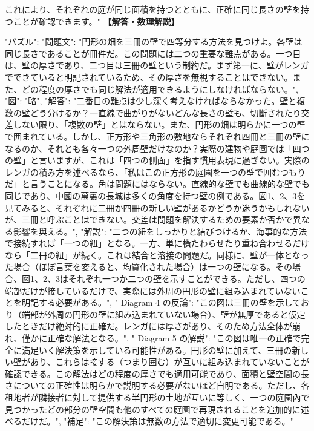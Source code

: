 \documentclass[10pt,a4paper,oneside,openany]{ltjsbook}
\begin{document}
\begin{tcolorbox}[colback=softblue,colframe=primaryblue,title=\textbf{第 194 問：THE GARDEN WALLS.},arc=2mm,boxrule=1pt,breakable]
{これにより、それぞれの庭が同じ面積を持つとともに、正確に同じ長さの壁を持つことが確認できます。"
}
\tcblower
\textbf{【解答・数理解説】}\par\vspace{0.3em}
{
"パズル": {
"問題文": "円形の畑を三冊の壁で四等分する方法を見つけよ。各壁は同じ長さであることが冊件だ。この問題には二つの重要な難点がある。一つ目は、壁の厚さであり、二つ目は三冊の壁という制約だ。まず第一に、壁がレンガでできていると明記されているため、その厚さを無視することはできない。また、どの程度の厚さでも同じ解法が適用できるようにしなければならない。",
"図": "略",
"解答": "二番目の難点は少し深く考えなければならなかった。壁と複数の壁どう分けるか？一直線で曲がりがないどんな長さの壁も、切斷されたり交差しない限り、「複数の壁」とはならない。また、円形の畑は明らかに一つの壁で囲まれている。しかし、正方形や三角形の敷地ならそれぞれ四冊と三冊の壁になるのか、それとも各々一つの外周壁だけなのか？実際の建物や庭園では「四つの壁」と言いますが、これは「四つの側面」を指す慣用表現に過ぎない。実際のレンガの積み方を述べるなら、「私はこの正方形の庭園を一つの壁で囲むつもりだ」と言うことになる。角は問題にはならない。直線的な壁でも曲線的な壁でも同じであり、中國の萬裏の長城は多くの角度を持つ壁の例である。図1、2、3を見てみると、それぞれに二冊か四冊の新しい壁があるかどうか迷うかもしれないが、三冊と呼ぶことはできない。交差は問題を解決するための要素か否かで異なる影響を與える。",
"解説": "二つの紐をしっかりと結びつけるか、海事的な方法で接続すれば「一つの紐」となる。一方、単に橫たわらせたり重ね合わせるだけなら「二冊の紐」が続く。これは結合と溶接の問題だ。同様に、壁が一体となった場合（ほぼ言葉を変えると、均質化された場合）は一つの壁になる。その場合、図1、2、3はそれぞれ一つか二つの壁を示すことができる。ただし、四つの端部だけが接しているだけで、実際には外周の円形の壁に組み込まれていないことを明記する必要がある。",
" Diagram 4 の反論": "この図は三冊の壁を示しており（端部が外周の円形の壁に組み込まれていない場合）、壁が無厚であると仮定したときだけ絶対的に正確だ。レンガには厚さがあり、そのため方法全体が崩れ、僅かに正確な解法となる。",
" Diagram 5 の解説": "この図は唯一の正確で完全に満足いく解決策を示している可能性がある。円形の壁に加えて、三冊の新しい壁があり、これらは接する（つまり囲む）が互いに組み込まれていないことが確認できる。この解法はどの程度の厚さでも適用可能であり、面積と壁空間の長さについての正確性は明らかで説明する必要がないほど自明である。ただし、各租地者が隣接者に対して提供する半円形の土地が互いに等しく、一つの庭園內で見つかったどの部分の壁空間も他のすべての庭園で再現されることを追加的に述べるだけだ。",
"補足": "この解決策は無数の方法で適切に変更可能である。"
}
}
\end{tcolorbox}
\end{document}
